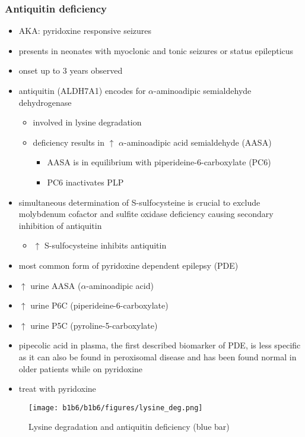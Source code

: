 \documentclass{scrartcl}
\begin{document}
\subsubsection{Antiquitin deficiency}
\label{sec:org3f326b4}
\begin{itemize}
\item AKA: pyridoxine responsive seizures
\item presents in neonates with myoclonic and tonic seizures or
status epilepticus
\item onset up to 3 years observed
\item antiquitin (ALDH7A1) encodes for \(\alpha\)-aminoadipic semialdehyde dehydrogenase
\begin{itemize}
\item involved in lysine degradation
\item deficiency results in \(\uparrow\) \(\alpha\)-aminoadipic acid semialdehyde (AASA)
\begin{itemize}
\item AASA is in equilibrium with piperideine-6-carboxylate (PC6)
\item PC6 inactivates PLP
\end{itemize}
\end{itemize}
\item simultaneous determination of S-sulfocysteine is crucial to exclude
molybdenum cofactor and sulfite oxidase deficiency causing secondary
inhibition of antiquitin
\begin{itemize}
\item \(\uparrow\) S-sulfocysteine inhibits antiquitin
\end{itemize}
\item most common form of pyridoxine dependent epilepsy (PDE)
\item \(\uparrow\) urine AASA (\(\alpha\)-aminoadipic acid)
\item \(\uparrow\) urine P6C (piperideine-6-carboxylate)
\item \(\uparrow\) urine P5C (pyroline-5-carboxylate)
\item pipecolic acid in plasma, the first described biomarker of PDE, is
less specific as it can also be found in peroxisomal disease and has
been found normal in older patients while on pyridoxine
\item treat with pyridoxine
\end{itemize}

\begin{figure}[htbp]
\centering
\texttt{[image: b1b6/b1b6/figures/lysine\_deg.png]}
\caption{\label{fig:orga9861c1}Lysine degradation and antiquitin deficiency (blue bar)}
\end{figure}
\end{document}

